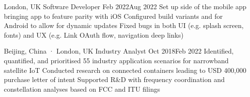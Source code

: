 

               {London, UK}
{Software Developer}                                {Feb 2022}{Aug 2022}
{Set up  side of the  mobile app bringing app to feature parity with iOS}
{Configured build variants and  for Android to allow for dynamic updates}
{Fixed bugs in both UI (e.g. splash screen, fonts) and UX (e.g.  Link OAuth flow, navigation deep links)}


       {Beijing, China · London, UK}
{Industry Analyst}                                  {Oct 2018}{Feb 2022}
{Identified, quantified, and prioritised 55 industry application scenarios for narrowband satellite IoT}
{Conducted research on connected containers leading to USD 400,000 purchase letter of intent}
{Supported R\&D with frequency coordination and constellation analyses based on FCC and ITU filings}





